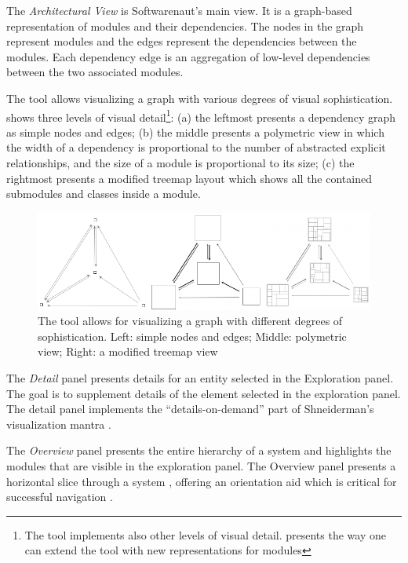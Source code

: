 \documentclass[preprint,12pt]{elsarticle}
\begin{document}
\begin{description}

\item The {\em Architectural View} is Softwarenaut's main view. It is a graph-based representation of modules and their dependencies. The nodes in the graph represent modules and the edges represent the dependencies between the modules. Each dependency edge is an aggregation of low-level dependencies between the two associated modules. 

The tool allows visualizing a graph with various degrees of visual sophistication.  shows three levels of visual detail\footnote{The tool implements also other levels of visual detail.  presents the way one can extend the tool with new representations for modules}: (a) the leftmost presents a dependency graph as simple nodes and edges; (b) the middle presents a polymetric view \cite{lanza-pv} in which the width of a dependency is proportional to the number of abstracted explicit relationships, and the size of a module is proportional to its size; (c) the rightmost presents a modified treemap layout which shows all the contained submodules and classes inside a module. 

\begin{figure}[h]
\begin{center}
\includegraphics[width=1.04\linewidth]{images/sofistication}
\caption{The tool allows for visualizing a graph with different degrees of sophistication. Left: simple nodes and edges; Middle: polymetric view; Right: a modified treemap view}

\end{center}
\end{figure}

\item The {\em Detail} panel presents details for an entity selected in the Exploration panel. The goal is to supplement details of the element selected in the exploration panel. The detail panel implements the ``details-on-demand'' part of Shneiderman's visualization mantra \cite{shneid-eyes}.

\item The {\em Overview} panel presents the entire hierarchy of a system and highlights the modules that are visible in the exploration panel. The Overview panel presents a horizontal slice through a system \cite{wong-thesis}, offering an orientation aid which is critical for successful navigation \cite{storey-awareness}.

\end{description}
\end{document}
